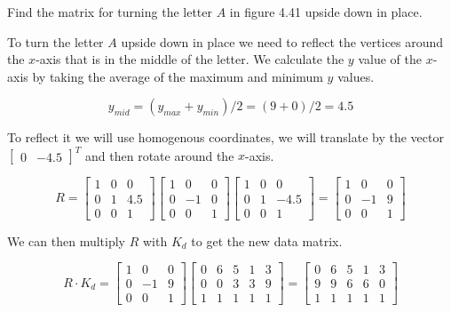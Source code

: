 \documentclass[../main.tex]{subfiles}
\begin{document}
Find the matrix for turning the letter $A$ in figure 4.41 upside down in place.

\solution

To turn the letter $A$ upside down in place we need to reflect the vertices around the $x$-axis
that is in the middle of the letter. We calculate the $y$ value of the $x$-axis by taking the
average of the maximum and minimum $y$ values. 

\[ y_{mid} = (y_{max}+y_{min})/2 = (9+0)/2 = 4.5 \]

To reflect it we will use homogenous coordinates, we will translate by the vector
$\begin{bmatrix}0&-4.5\end{bmatrix}^T$ and then rotate around the $x$-axis. 

\[ R = \begin{bmatrix}
            1 & 0 & 0\\
            0 & 1 & 4.5\\
            0 & 0 & 1
        \end{bmatrix}
        \begin{bmatrix}
            1 & 0 & 0\\
            0 & -1 & 0\\
            0 & 0 & 1
        \end{bmatrix}
        \begin{bmatrix}
            1 & 0 & 0\\
            0 & 1 & -4.5\\
            0 & 0 & 1
        \end{bmatrix} =
        \begin{bmatrix}
            1 & 0 & 0\\
            0 & -1 & 9\\
            0 & 0 & 1
        \end{bmatrix}
\]

We can then multiply $R$ with $K_d$ to get the new data matrix.

\[ R\cdot K_d = \begin{bmatrix}
                    1 & 0 & 0\\
                    0 & -1 & 9\\
                    0 & 0 & 1
                \end{bmatrix}
                \begin{bmatrix}
                    0 & 6 & 5 & 1 & 3\\
                    0 & 0 & 3 & 3 & 9\\
                    1 & 1 & 1 & 1 & 1
                \end{bmatrix} = 
                \begin{bmatrix}
                    0&6&5&1&3\\
                    9&9&6&6&0\\
                    1&1&1&1&1
                \end{bmatrix}
\]
\end{document}
